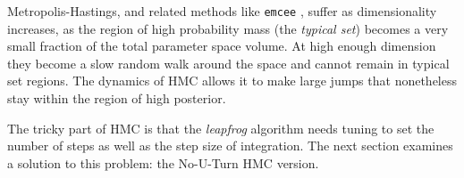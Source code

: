 \documentclass[twocolumn,twocolappendix,nofootinbib,iop]{openjournal}
\newcommand{\jaxcosmo}{\texttt{jax-cosmo}}
\begin{document}
Metropolis-Hastings, and related methods like \texttt{emcee} \citep{goodman-weare,emcee},  suffer as dimensionality increases,  as the region of high probability mass (the \textit{typical set}) becomes a very small fraction of the total parameter space volume. At high enough dimension they become a slow random walk around the space and cannot remain in typical set regions.
The dynamics of HMC allows it to make large jumps that nonetheless stay within the region of high posterior.

The tricky part of HMC is that the \textit{leapfrog} algorithm needs tuning to set the number of steps as well as the step size of integration. The next section examines a solution to this problem: the No-U-Turn HMC version.



%
%
%
%
\end{document}
